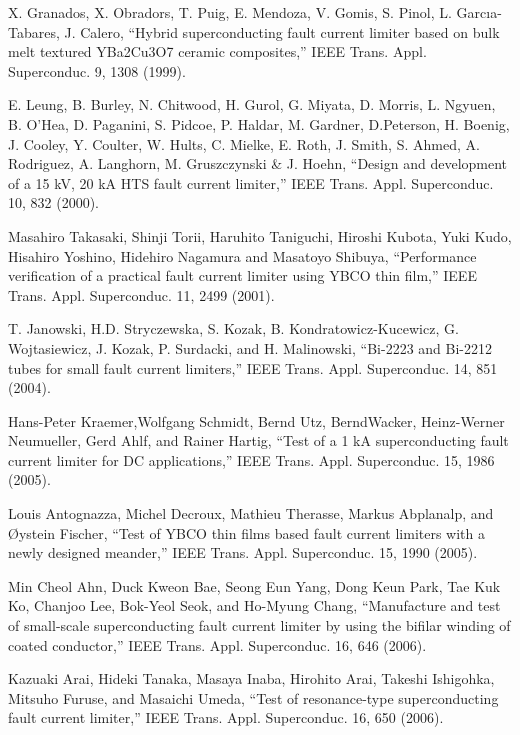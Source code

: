 \noindent [9.126] X. Granados, X. Obradors, T. Puig, E. Mendoza, V. Gomis, S. Pinol, L. Garcıa-Tabares, J. Calero, ``Hybrid superconducting fault current limiter based on bulk melt textured YBa2Cu3O7 ceramic composites,” IEEE Trans. Appl. Superconduc.
9, 1308 (1999).

\noindent [9.127] E. Leung, B. Burley, N. Chitwood, H. Gurol, G. Miyata, D. Morris, L. Ngyuen,
B. O’Hea, D. Paganini, S. Pidcoe, P. Haldar, M. Gardner, D.Peterson, H. Boenig,
J. Cooley, Y. Coulter, W. Hults, C. Mielke, E. Roth, J. Smith, S. Ahmed, A. Rodriguez,
A. Langhorn, M. Gruszczynski \& J. Hoehn, ``Design and development of
a 15 kV, 20 kA HTS fault current limiter,” IEEE Trans. Appl. Superconduc. 10,
832 (2000).

\noindent [9.128] Masahiro Takasaki, Shinji Torii, Haruhito Taniguchi, Hiroshi Kubota, Yuki Kudo,
Hisahiro Yoshino, Hidehiro Nagamura and Masatoyo Shibuya, ``Performance verification
of a practical fault current limiter using YBCO thin film,” IEEE Trans.
Appl. Superconduc. 11, 2499 (2001).

\noindent [9.129] T. Janowski, H.D. Stryczewska, S. Kozak, B. Kondratowicz-Kucewicz, G. Wojtasiewicz,
J. Kozak, P. Surdacki, and H. Malinowski, ``Bi-2223 and Bi-2212 tubes
for small fault current limiters,” IEEE Trans. Appl. Superconduc. 14, 851 (2004).

\noindent [9.130] Hans-Peter Kraemer,Wolfgang Schmidt, Bernd Utz, BerndWacker, Heinz-Werner
Neumueller, Gerd Ahlf, and Rainer Hartig, ``Test of a 1 kA superconducting fault
current limiter for DC applications,” IEEE Trans. Appl. Superconduc. 15, 1986
(2005).

\noindent [9.131] Louis Antognazza, Michel Decroux, Mathieu Therasse, Markus Abplanalp, and Øystein Fischer, ``Test of YBCO thin films based fault current limiters with a newly designed meander,” IEEE Trans. Appl. Superconduc. 15, 1990 (2005).

\noindent [9.132] Min Cheol Ahn, Duck Kweon Bae, Seong Eun Yang, Dong Keun Park, Tae Kuk
Ko, Chanjoo Lee, Bok-Yeol Seok, and Ho-Myung Chang, ``Manufacture and test
of small-scale superconducting fault current limiter by using the bifilar winding
of coated conductor,” IEEE Trans. Appl. Superconduc. 16, 646 (2006).

\noindent [9.133] Kazuaki Arai, Hideki Tanaka, Masaya Inaba, Hirohito Arai, Takeshi Ishigohka,
Mitsuho Furuse, and Masaichi Umeda, ``Test of resonance-type superconducting
fault current limiter,” IEEE Trans. Appl. Superconduc. 16, 650 (2006).

